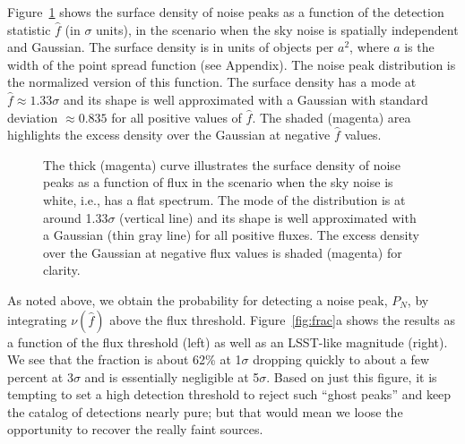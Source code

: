 \documentclass[twocolumn]{emulateapj}
\newcommand{\flux}{f}
\newcommand{\fest}{\hat{\flux}}  %
\newcommand{\npd}{\nu}  %
\begin{document}
Figure~\ref{fig:surface} shows the surface density of noise peaks as a function of the detection statistic $\fest$ (in $\sigma$ units), in the scenario when the sky noise is spatially independent and Gaussian.
The surface density is in units of objects per $a^2$, where $a$ is the width of the point spread function (see Appendix).
The noise peak distribution is the normalized version of this function.
The surface density has a mode at $\fest \approx 1.33\sigma$ and its shape is well approximated with a Gaussian with standard deviation $\approx 0.835$ for all positive values of $\fest$. 
The shaded (magenta) area highlights the excess density over the Gaussian at negative $\fest$ values.

\begin{figure}
\caption{The thick (magenta) curve illustrates the surface density of noise peaks as a function of flux in the scenario when the sky noise is white, i.e., has a flat spectrum. The mode of the distribution is at around 1.33$\sigma$ (vertical line) and its shape is well approximated with a Gaussian (thin gray line) for all positive fluxes. The excess density over the Gaussian at negative flux values is shaded (magenta) for clarity.}
\label{fig:surface}
\end{figure}

As noted above, we obtain the probability for detecting a noise peak, $P_N$, by integrating $\npd(\fest)$ above the flux threshold.
%
Figure~\ref{fig:frac}a shows the results as a function of the flux threshold (left) as well as an LSST-like magnitude (right). We see that the fraction is about 62\% at 1$\sigma$ dropping quickly to about a few percent at 3$\sigma$ and is essentially negligible at 5$\sigma$.
%
Based on just this figure, it is tempting to set a high detection threshold to reject such ``ghost peaks'' and keep the catalog of detections nearly pure; but that would mean we loose the opportunity to recover the really faint sources. 

\begin{figure*}
\caption{The fraction of detected noise peaks drops quickly by raising the threshold. At 1$\sigma$ the value is about 62\% but at 3$\sigma$ it is only a few percent and at 5$\sigma$, which is 24 magnitudes in this case, the detected fraction is negligible. Naively this makes it highly desirable to put a harder constraint on the detection limit but then the opportunity is lost to track fainter sources. The right solution is not this shortcut.}
\label{fig:frac}
\end{figure*}
\end{document}
